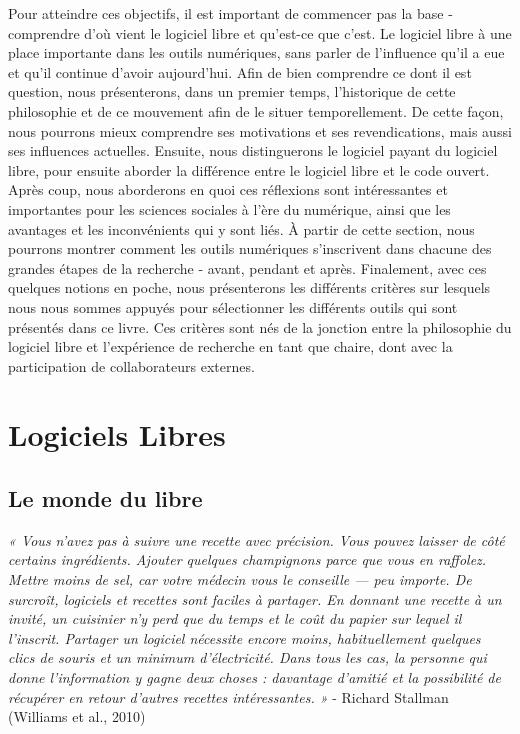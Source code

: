 \documentclass[
  letterpaper,
  DIV=11,
  numbers=noendperiod]{scrreprt}
\begin{document}
Pour atteindre ces objectifs, il est important de commencer pas la base
- comprendre d'où vient le logiciel libre et qu'est-ce que c'est. Le
logiciel libre à une place importante dans les outils numériques, sans
parler de l'influence qu'il a eue et qu'il continue d'avoir aujourd'hui.
Afin de bien comprendre ce dont il est question, nous présenterons, dans
un premier temps, l'historique de cette philosophie et de ce mouvement
afin de le situer temporellement. De cette façon, nous pourrons mieux
comprendre ses motivations et ses revendications, mais aussi ses
influences actuelles. Ensuite, nous distinguerons le logiciel payant du
logiciel libre, pour ensuite aborder la différence entre le logiciel
libre et le code ouvert. Après coup, nous aborderons en quoi ces
réflexions sont intéressantes et importantes pour les sciences sociales
à l'ère du numérique, ainsi que les avantages et les inconvénients qui y
sont liés. À partir de cette section, nous pourrons montrer comment les
outils numériques s'inscrivent dans chacune des grandes étapes de la
recherche - avant, pendant et après. Finalement, avec ces quelques
notions en poche, nous présenterons les différents critères sur lesquels
nous nous sommes appuyés pour sélectionner les différents outils qui
sont présentés dans ce livre. Ces critères sont nés de la jonction entre
la philosophie du logiciel libre et l'expérience de recherche en tant
que chaire, dont avec la participation de collaborateurs externes.

\section{Logiciels Libres}\label{logiciels-libres}

\subsection{Le monde du libre}\label{le-monde-du-libre}

\emph{« Vous n'avez pas à suivre une recette avec précision. Vous pouvez
laisser de côté certains ingrédients. Ajouter quelques champignons parce
que vous en raffolez. Mettre moins de sel, car votre médecin vous le
conseille --- peu importe. De surcroît, logiciels et recettes sont
faciles à partager. En donnant une recette à un invité, un cuisinier n'y
perd que du temps et le coût du papier sur lequel il l'inscrit. Partager
un logiciel nécessite encore moins, habituellement quelques clics de
souris et un minimum d'électricité. Dans tous les cas, la personne qui
donne l'information y gagne deux choses : davantage d'amitié et la
possibilité de récupérer en retour d'autres recettes intéressantes. »} -
Richard Stallman (Williams et al., 2010)
\end{document}
